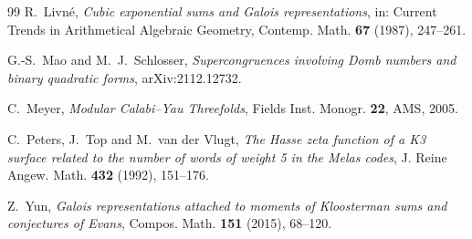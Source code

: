 \documentclass[11pt]{amsart}
\theoremstyle{definition}
\begin{document}
\begin{thebibliography}{99}
 R.~Livn\'e, \emph{Cubic exponential sums and Galois representations}, in: Current Trends in Arithmetical Algebraic Geometry, Contemp. Math. \textbf{67} (1987), 247--261.

 G.-S.~Mao and M.~J.~Schlosser, \emph{Supercongruences involving Domb numbers and binary quadratic forms}, arXiv:2112.12732.

 C.~Meyer, \emph{Modular Calabi--Yau Threefolds}, Fields Inst. Monogr. \textbf{22}, AMS, 2005.

 C.~Peters, J.~Top and M.~van der Vlugt, \emph{The Hasse zeta function of a K3 surface related to the number of words of weight 5 in the Melas codes}, J. Reine Angew. Math. \textbf{432} (1992), 151--176.

 Z.~Yun, \emph{Galois representations attached to moments of Kloosterman sums and conjectures of Evans}, Compos. Math. \textbf{151} (2015), 68--120.

\end{thebibliography}
\end{document}
